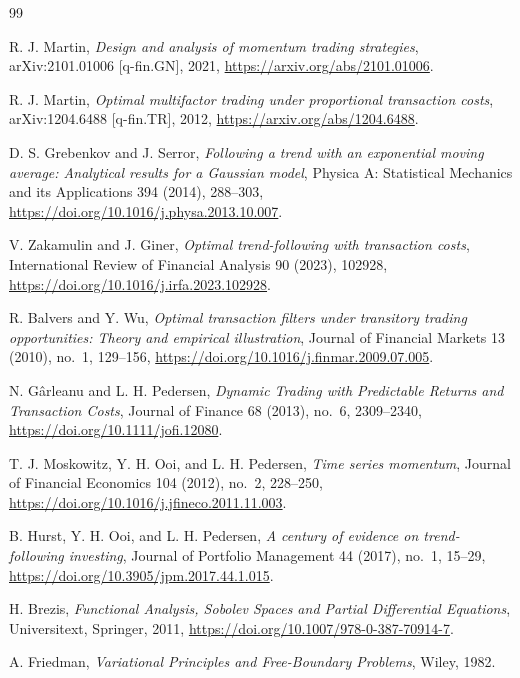 \documentclass[11pt]{article}
\theoremstyle{definition}
\theoremstyle{remark}
\begin{document}
\begin{thebibliography}{99}

R. J. Martin,
\emph{Design and analysis of momentum trading strategies},
arXiv:2101.01006 [q-fin.GN], 2021,
\url{https://arxiv.org/abs/2101.01006}.

R. J. Martin,
\emph{Optimal multifactor trading under proportional transaction costs},
arXiv:1204.6488 [q-fin.TR], 2012,
\url{https://arxiv.org/abs/1204.6488}.

D. S. Grebenkov and J. Serror,
\emph{Following a trend with an exponential moving average: Analytical results for a Gaussian model},
Physica A: Statistical Mechanics and its Applications 394 (2014), 288--303,
\url{https://doi.org/10.1016/j.physa.2013.10.007}.

V. Zakamulin and J. Giner,
\emph{Optimal trend-following with transaction costs},
International Review of Financial Analysis 90 (2023), 102928,
\url{https://doi.org/10.1016/j.irfa.2023.102928}.

R. Balvers and Y. Wu,
\emph{Optimal transaction filters under transitory trading opportunities: Theory and empirical illustration},
Journal of Financial Markets 13 (2010), no.~1, 129--156,
\url{https://doi.org/10.1016/j.finmar.2009.07.005}.

N. Gârleanu and L. H. Pedersen,
\emph{Dynamic Trading with Predictable Returns and Transaction Costs},
Journal of Finance 68 (2013), no.~6, 2309--2340,
\url{https://doi.org/10.1111/jofi.12080}.

T. J. Moskowitz, Y. H. Ooi, and L. H. Pedersen,
\emph{Time series momentum}, Journal of Financial Economics 104 (2012),
no.~2, 228--250, \url{https://doi.org/10.1016/j.jfineco.2011.11.003}.

B. Hurst, Y. H. Ooi, and L. H. Pedersen,
\emph{A century of evidence on trend-following investing}, Journal of Portfolio
Management 44 (2017), no.~1, 15--29,
\url{https://doi.org/10.3905/jpm.2017.44.1.015}.

H. Brezis, \emph{Functional Analysis, Sobolev Spaces and Partial Differential
Equations}, Universitext, Springer, 2011,
\url{https://doi.org/10.1007/978-0-387-70914-7}.

A. Friedman, \emph{Variational Principles and Free-Boundary Problems}, Wiley,
1982.


\end{thebibliography}
\end{document}
